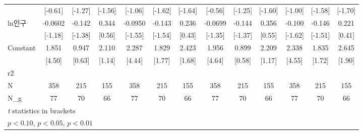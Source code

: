 \begin{table}[htbp]
{\begin{tabular}{l*{12}{c}}
                    &     [-0.61]         &     [-1.27]         &     [-1.56]         &     [-1.06]         &     [-1.62]         &     [-1.64]         &     [-0.56]         &     [-1.25]         &     [-1.60]         &     [-1.00]         &     [-1.58]         &     [-1.70]         \\
\addlinespace
ln인구            &     -0.0602         &      -0.142         &       0.344         &     -0.0950         &      -0.143         &       0.236         &     -0.0699         &      -0.144         &       0.356         &      -0.100         &      -0.146         &       0.221         \\
                    &     [-1.18]         &     [-1.38]         &      [0.56]         &     [-1.55]         &     [-1.54]         &      [0.43]         &     [-1.35]         &     [-1.37]         &      [0.55]         &     [-1.62]         &     [-1.51]         &      [0.41]         \\
\addlinespace
Constant            &       1.851\sym{***}&       0.947         &       2.110         &       2.287\sym{***}&       1.829\sym{*}  &       2.423\sym{*}  &       1.956\sym{***}&       0.899         &       2.209         &       2.338\sym{***}&       1.835\sym{*}  &       2.645\sym{*}  \\
                    &      [4.50]         &      [0.63]         &      [1.14]         &      [4.44]         &      [1.77]         &      [1.68]         &      [4.64]         &      [0.58]         &      [1.17]         &      [4.55]         &      [1.72]         &      [1.90]         \\
\midrule
r2                  &                     &                     &                     &                     &                     &                     &                     &                     &                     &                     &                     &                     \\
N                   &         358         &         215         &         155         &         358         &         215         &         155         &         358         &         215         &         155         &         358         &         215         &         155         \\
N\_g                 &          77         &          70         &          66         &          77         &          70         &          66         &          77         &          70         &          66         &          77         &          70         &          66         \\
\bottomrule
\multicolumn{13}{l}{\footnotesize \textit{t} statistics in brackets}\\
\multicolumn{13}{l}{\footnotesize \sym{*} \(p<0.10\), \sym{**} \(p<0.05\), \sym{***} \(p<0.01\)}\\
\end{tabular}}
\end{table}
